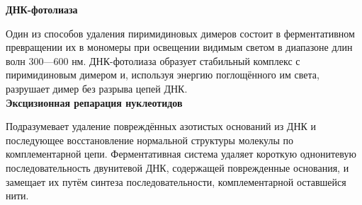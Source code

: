 \textbf{ДНК-фотолиаза}

Один из способов удаления пиримидиновых димеров состоит в ферментативном превращении их в мономеры при освещении видимым светом в диапазоне длин волн 300—600 нм. ДНК-фотолиаза образует стабильный комплекс с пиримидиновым димером и, используя энергию поглощённого им света, разрушает димер без разрыва цепей ДНК. \\

\textbf{Эксцизионная репарация нуклеотидов}

Подразумевает удаление повреждённых азотистых оснований из ДНК и последующее восстановление нормальной структуры молекулы по комплементарной цепи. Ферментативная система удаляет короткую однонитевую последовательность двунитевой ДНК, содержащей поврежденные основания, и замещает их путём синтеза последовательности, комплементарной оставшейся нити. \\
